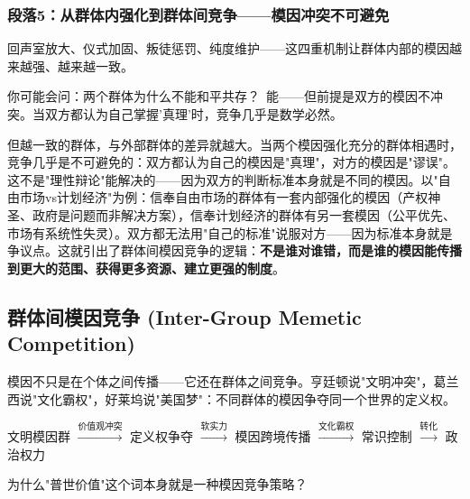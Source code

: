 \documentclass[../main.tex]{subfiles}
\begin{document}
	\subsubsection*{段落5：从群体内强化到群体间竞争——模因冲突不可避免}

	回声室放大、仪式加固、叛徒惩罚、纯度维护——这四重机制让群体内部的模因越来越强、越来越一致。

	\begin{tcolorbox}[colback=yellow!5, title=\textit{读者行为预测}]

		你可能会问：两个群体为什么不能和平共存？\ 能——但前提是双方的模因不冲突。当双方都认为自己掌握'真理'时，竞争几乎是数学必然。

	\end{tcolorbox}

但越一致的群体，与外部群体的差异就越大。当两个模因强化充分的群体相遇时，竞争几乎是不可避免的：双方都认为自己的模因是"真理"，对方的模因是"谬误"。这不是"理性辩论"能解决的——因为双方的判断标准本身就是不同的模因。以"自由市场vs计划经济"为例：信奉自由市场的群体有一套内部强化的模因（产权神圣、政府是问题而非解决方案），信奉计划经济的群体有另一套模因（公平优先、市场有系统性失灵）。双方都无法用"自己的标准"说服对方——因为标准本身就是争议点。这就引出了群体间模因竞争的逻辑：\textbf{不是谁对谁错，而是谁的模因能传播到更大的范围、获得更多资源、建立更强的制度}。

	\subsection{群体间模因竞争 (Inter-Group Memetic Competition)}

	\begin{motivation}

		模因不只是在个体之间传播——它还在群体之间竞争。亨廷顿说"文明冲突"，葛兰西说"文化霸权"，好莱坞说"美国梦"：不同群体的模因争夺同一个世界的定义权。

	\end{motivation}

	\begin{logicmap}

		文明模因群 $\xrightarrow{\text{价值观冲突}}$ 定义权争夺 $\xrightarrow{\text{软实力}}$ 模因跨境传播 $\xrightarrow{\text{文化霸权}}$ 常识控制 $\xrightarrow{\text{转化}}$ 政治权力

	\end{logicmap}

	\begin{questionbox}

		为什么"普世价值"这个词本身就是一种模因竞争策略？

	\end{questionbox}
\end{document}
